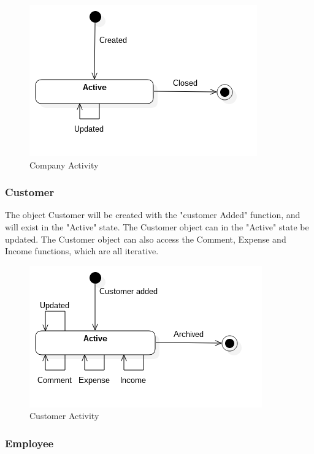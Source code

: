 \begin{figure}[H]
    \centering
    \includegraphics[scale=0.6]{Images/ProblemDomain/companyActivityDiagram.png}
    \caption{Company Activity}
    \label{fig:companyActivityDiagram}
\end{figure}

\subsubsection*{Customer}

The object Customer will be created with the "customer Added" function, and will exist in the "Active" state. The Customer object can in the "Active" state be updated. The Customer object can also access the Comment, Expense and Income functions, which are all iterative.

\begin{figure}[H]
    \centering
    \includegraphics[scale=0.6]{Images/ProblemDomain/customerActivityDiagram.png}
    \caption{Customer Activity}
    \label{fig:customerActivityDiagram}
\end{figure}

\subsubsection*{Employee}

